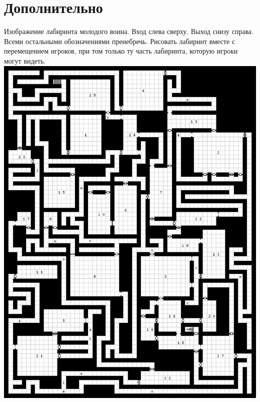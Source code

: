 \documentclass{article}
\begin{document}
\section{Дополнительно}
\label{5000}
Изображение лабиринта молодого воина.
Вход слева сверху.
Выход снизу справа.
Всеми остальными обозначениями пренебречь.
Рисовать лабиринт вместе с перемещением игроков, при том только ту часть лабиринта, которую игроки могут видеть.
\newline
\includegraphics[width=1\textwidth]{imgs/labirint} \label{lab_img}
\end{document}
